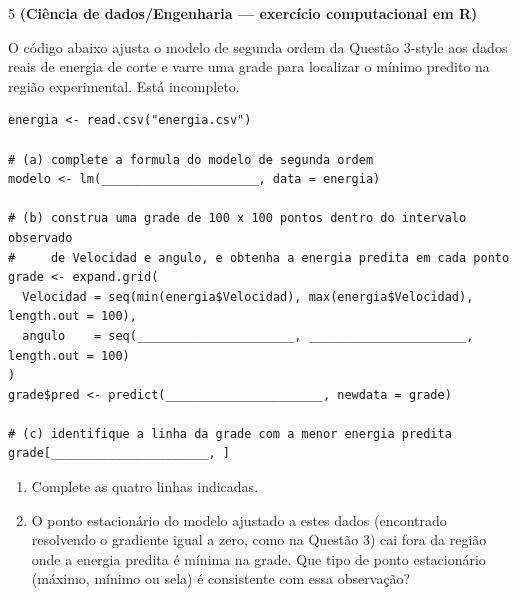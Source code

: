 \documentclass[11pt]{article}
\begin{document}
\begin{questao}{5} \textbf{(Ciência de dados/Engenharia --- exercício computacional em R)}

O código abaixo ajusta o modelo de segunda ordem da Questão 3-style aos dados reais de energia de
corte e varre uma grade para localizar o mínimo predito na região experimental. Está incompleto.

\begin{lstlisting}
energia <- read.csv("energia.csv")

# (a) complete a formula do modelo de segunda ordem
modelo <- lm(______________________, data = energia)

# (b) construa uma grade de 100 x 100 pontos dentro do intervalo observado
#     de Velocidad e angulo, e obtenha a energia predita em cada ponto
grade <- expand.grid(
  Velocidad = seq(min(energia$Velocidad), max(energia$Velocidad), length.out = 100),
  angulo    = seq(______________________, ______________________, length.out = 100)
)
grade$pred <- predict(______________________, newdata = grade)

# (c) identifique a linha da grade com a menor energia predita
grade[______________________, ]
\end{lstlisting}

\begin{enumerate}[label=(\alph*)]
  \item Complete as quatro linhas indicadas.
  \item O ponto estacionário do modelo ajustado a estes dados (encontrado resolvendo o gradiente
    igual a zero, como na Questão 3) cai fora da região onde a energia predita é mínima na grade.
    Que tipo de ponto estacionário (máximo, mínimo ou sela) é consistente com essa observação?
\end{enumerate}
\end{questao}
\end{document}

